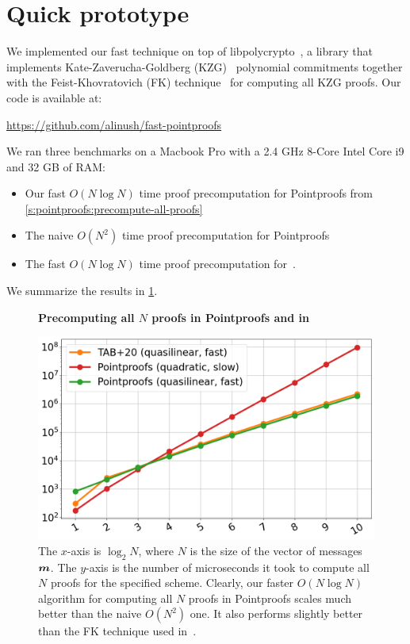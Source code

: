 \section{Quick prototype}

We implemented our fast technique on top of \textsf{libpolycrypto}~\cite{libpolycrypto}, a library that implements Kate-Zaverucha-Goldberg (KZG)~\cite{KZG10} polynomial commitments together with the Feist-Khovratovich (FK) technique~\cite{FK20} for computing all KZG proofs.
Our code is available at:
\begin{center}
    \url{https://github.com/alinush/fast-pointproofs}
\end{center}

\noindent We ran three benchmarks on a Macbook Pro with a 2.4 GHz 8-Core Intel Core i9 and 32 GB of RAM:
\begin{itemize}
    \item Our fast $O(N\log{N})$ time proof precomputation for Pointproofs from \cref{s:pointproofs:precompute-all-proofs}
    \item The naive $O(N^2)$ time proof precomputation for Pointproofs
    \item The fast $O(N\log{N})$ time proof precomputation for~\cite{TAB+20}.
\end{itemize}

\noindent We summarize the results in \cref{f:benchmarks}.
\begin{figure}[h]
    \centering
    \textbf{Precomputing all $N$ proofs in Pointproofs and in ~\cite{TAB+20}}\par\medskip
    \includegraphics[width=0.80\columnwidth]{fk-vs-pointproofs.png}
    \caption{
        The $x$-axis is $\log_2{N}$, where $N$ is the size of the vector of messages $\bm{m}$.
        The $y$-axis is the number of microseconds it took to compute all $N$ proofs for the specified scheme.
        Clearly, our faster $O(N\log{N})$ algorithm for computing all $N$ proofs in Pointproofs scales much better than the naive $O(N^2)$ one.
        It also performs slightly better than the FK technique used in~\cite{TAB+20}.
    }
    \label{f:benchmarks}
\end{figure}
